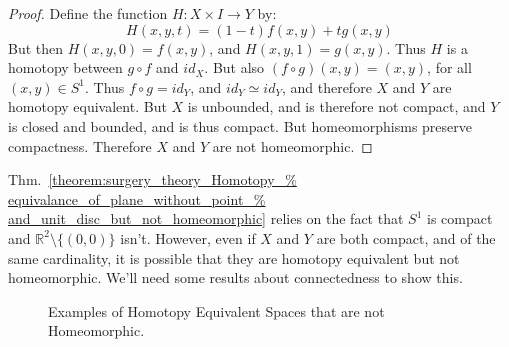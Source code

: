 \documentclass[crop=false,class=book,oneside]{standalone}                      %
\begin{document}
\begin{proof}
                Define the function $H:X\times{I}\rightarrow{Y}$ by:
                \begin{equation}
                    H(x,y,t)=(1-t)f(x,y)+tg(x,y)
                \end{equation}
                But then $H(x,y,0)=f(x,y)$, and $H(x,y,1)=g(x,y)$. Thus $H$ is a
                homotopy between ${g}\circ{f}$ and $id_{X}$. But also
                $({f}\circ{g})(x,y)=(x,y)$, for all $(x,y)\in S^{1}$.
                Thus ${f}\circ{g}=id_{Y}$, and ${id_{Y}}\simeq{id_{Y}}$,
                and therefore $X$ and $Y$ are homotopy equivalent.
                But $X$ is unbounded, and is therefore not compact,
                and $Y$ is closed and bounded, and is thus compact.
                But homeomorphisms preserve compactness. Therefore $X$
                and $Y$ are not homeomorphic.
            \end{proof}
            Thm.~\ref{theorem:surgery_theory_Homotopy_%
                      equivalance_of_plane_without_point_%
                      and_unit_disc_but_not_homeomorphic}
            relies on the fact that $S^{1}$ is compact and
            $\mathbb{R}^{2}\setminus\{(0,0)\}$ isn't.
            However, even if $X$ and $Y$ are both
            compact, and of the same cardinality, it is possible
            that they are homotopy equivalent but not homeomorphic.
            We'll need some results about connectedness to show this.
            \begin{figure}[H]
                \centering
                \captionsetup{type=figure}
                \begin{subfigure}[b]{0.33\textwidth}
                    \captionsetup{type=figure}
                    \centering
                    
                    \label{fig:homotopy_equivalence_of_plane_with_point}
                \end{subfigure}
                \begin{subfigure}[b]{0.66\textwidth}
                    \captionsetup{type=figure}
                    \centering
                    
                    \label{fig:homotopy_equivalence_between_the_plane_with_a_point_removed_and_the_unit_circle}
                \end{subfigure}
                \caption{Examples of Homotopy Equivalent Spaces that are not Homeomorphic.}
                \label{fig:surgery_theory_course_various_HE_but_not_homeo_examples}
            \end{figure}
\end{document}
